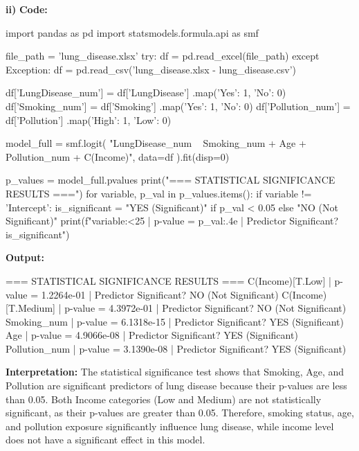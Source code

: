 \documentclass[12pt,a4paper]{article}
\begin{document}
\textbf{ii)}
\textbf{Code:}
\begin{codebox}
import pandas as pd
import statsmodels.formula.api as smf

file_path = 'lung_disease.xlsx'
try:
    df = pd.read_excel(file_path)
except Exception:
    df = pd.read_csv('lung_disease.xlsx - lung_disease.csv')

df['LungDisease_num'] = df['LungDisease']
.map({'Yes': 1, 'No': 0})
df['Smoking_num'] = df['Smoking']
.map({'Yes': 1, 'No': 0})
df['Pollution_num'] = df['Pollution']
.map({'High': 1, 'Low': 0})

model_full = smf.logit(
    "LungDisease_num ~ Smoking_num + Age +
    Pollution_num + C(Income)",
    data=df
).fit(disp=0)

p_values = model_full.pvalues
print("=== STATISTICAL SIGNIFICANCE RESULTS ===")
for variable, p_val in p_values.items():
    if variable != 'Intercept':
        is_significant = "YES (Significant)" if p_val 
        < 0.05 else "NO (Not Significant)"
        print(f"{variable:<25} | p-value = {p_val:.4e} |
        Predictor Significant? {is_significant}")
\end{codebox}

\textbf{Output:}
\begin{codebox}
=== STATISTICAL SIGNIFICANCE RESULTS ===
C(Income)[T.Low]          | p-value = 1.2264e-01 
| Predictor Significant? NO (Not Significant)
C(Income)[T.Medium]       | p-value = 4.3972e-01 
| Predictor Significant? NO (Not Significant)
Smoking_num               | p-value = 6.1318e-15
| Predictor Significant? YES (Significant)
Age                       | p-value = 4.9066e-08
| Predictor Significant? YES (Significant)
Pollution_num             | p-value = 3.1390e-08 
| Predictor Significant? YES (Significant)
\end{codebox}

\textbf{Interpretation:}
The statistical significance test shows that Smoking, Age, and Pollution are significant predictors of lung disease because their p-values are less than 0.05.
Both Income categories (Low and Medium) are not statistically significant, as their p-values are greater than 0.05.
Therefore, smoking status, age, and pollution exposure significantly influence lung disease, while income level does not have a significant effect in this model.
\end{document}
